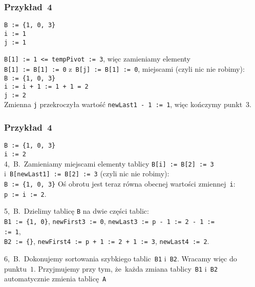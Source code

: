\documentclass[10pt,t]{beamer}
\begin{document}
\begin{frame}
  \frametitle{Przykład~4}

  \texttt{B := \{1, 0, 3\} } \\
  \texttt{i := 1} \\
  \texttt{j := 1}

  \texttt{B[1] := 1 <= tempPivot := 3}, więc zamieniamy elementy \\
  \texttt{B[1] := B[1] := 0} z~\texttt{B[j] := B[1] := 0},
  miejscami (czyli nic nie robimy): \\
  \texttt{B := \{1, 0, 3\} } \\
  \texttt{i := i + 1 := 1 + 1 = 2} \\
  \texttt{j := 2} \\
  Zmienna \texttt{j} przekroczyła wartość \texttt{newLast1 - 1 := 1}, więc
  kończymy punkt~$3$.

\end{frame}





\begin{frame}
  \frametitle{Przykład~4}


  \texttt{B := \{1, 0, 3\} } \\
  \texttt{i := 2} \\

  4,~B.~Zamieniamy miejscami elementy tablicy \texttt{B[i] := B[2] := 3}
  i~\texttt{B[newLast1] := B[2] := 3} (czyli nic nie robimy): \\
  \texttt{B := \{1, 0, 3\}}
  Oś obrotu jest teraz równa obecnej wartości zmiennej~\texttt{i}: \\
  \texttt{p := i := 2}.

  5,~B.~Dzielimy tablicę \texttt{B} na dwie części tablic: \\
  \texttt{B1 := \{1, 0\}}, \texttt{newFirst3 := 0},
  \texttt{newLast3 := p - 1 := 2 - 1 :=} \\
  \texttt{:= 1}, \\
  \texttt{B2 := \{\}}, \texttt{newFirst4 := p + 1 := 2 + 1 := 3},
  \texttt{newLast4 := 2}.

  6,~B.~Dokonujemy sortowania szybkiego tablic~\texttt{B1} i~\texttt{B2}.
  Wracamy więc do punktu~$1$. Przyjmujemy przy tym, że~każda zmiana
  tablicy~\texttt{B1} i~\texttt{B2} automatycznie zmienia
  tablicę~\texttt{A}

\end{frame}
\end{document}
